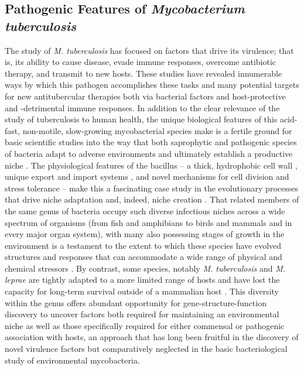 \subsection{Pathogenic Features of \textit{Mycobacterium tuberculosis}}\label{path:tb}

The study of \textit{M. tuberculosis} has focused on factors that drive its virulence; that is, its ability to cause disease, evade immune responses, overcome antibiotic therapy, and transmit to new hosts. These studies have revealed innumerable ways by which this pathogen accomplishes these tasks and many potential targets for new antitubercular therapies both via bacterial factors and host-protective and -detrimental immune responses. In addition to the clear relevance of the study of tuberculosis to human health, the unique biological features of this acid-fast, non-motile, slow-growing mycobacterial species make is a fertile ground for basic scientific studies into the way that both saprophytic and pathogenic species of bacteria adapt to adverse environments and ultimately establish a productive niche \citep{Prasanthi2014, Falkinham2009, Ghodbane2014, Houben2006, Pieters2002}. The physiological features of the bacillus -- a thick, hydrophobic cell wall \citep{Chatterjee1997, Jarlier1994, Jankute2015}, unique export and import systems \citep{Houben2014, Bunduc2020, Famelis2019, Pandey2008, Tullius2011, Braibant2000}, and novel mechanisms for cell division \citep{Hett2008, Odermatt2020, Dziadek2003, Kieser2014} and stress tolerance \citep{Garg2015, Peddireddy2017} -- make this a fascinating case study in the evolutionary processes that drive niche adaptation and, indeed, niche creation \citep{Lovewell2021, Honda2018, Lerner2016, Gengenbacher2012, Sarathy2020, Warner2007}. That related members of the same genus of bacteria occupy such diverse infectious niches across a wide spectrum of organisms (from fish and amphibians to birds and mammals and in every major organ system), with many also possessing stages of growth in the environment is a testament to the extent to which these species have evolved structures and responses that can accommodate a wide range of physical and chemical stressors \citep{Thoen1981, Palmer2011, Hershberg2016, Saelens2019, Larsen2020}. By contrast, some species, notably \textit{M. tuberculosis} and \textit{M. leprae} are tightly adapted to a more limited range of hosts and have lost the capacity for long-term survival outside of a mammalian host \citep{Ploemacher2020, Borham2022, Martinez2019, Mtetwa2022}. This diversity within the genus offers abundant opportunity for gene-structure-function discovery to uncover factors both required for maintaining an environmental niche as well as those specifically required for either commensal or pathogenic association with hosts, an approach that has long been fruitful in the discovery of novel virulence factors \citep{Sassetti2003, Ehrt2015} but comparatively neglected in the basic bacteriological study of environmental mycobacteria.

